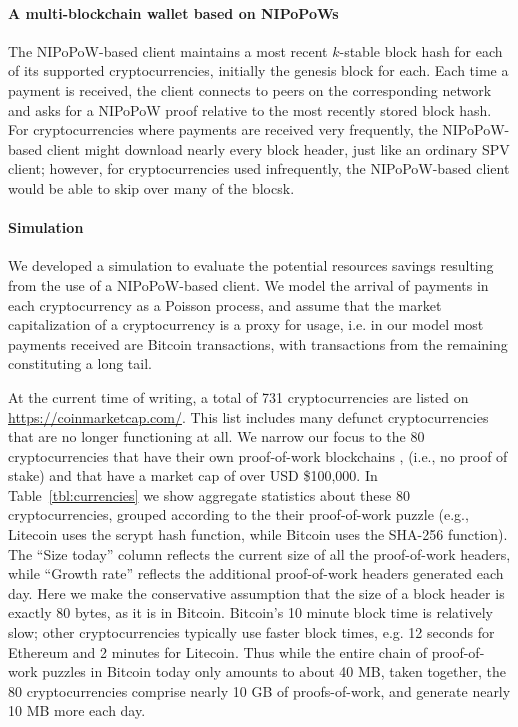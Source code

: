 \paragraph{A multi-blockchain wallet based on NIPoPoWs}
 The NIPoPoW-based client maintains a most recent $k$-stable block hash for each of its supported cryptocurrencies, initially the genesis block for each.
  Each time a payment is received, the client connects to peers on the corresponding network and asks for a NIPoPoW proof relative to the most recently stored block hash. For cryptocurrencies where payments are received very frequently, the NIPoPoW-based client might download nearly every block header, just like an ordinary SPV client; however, for cryptocurrencies used infrequently, the NIPoPoW-based client would be able to skip over many of the blocsk.

\paragraph{Simulation}
 We developed a simulation to evaluate the potential resources savings resulting from the use of a NIPoPoW-based client.
 We model the arrival of payments in each cryptocurrency as a Poisson process, and assume that the market capitalization of a cryptocurrency is a proxy for usage, i.e. in our model most payments received are Bitcoin transactions, with transactions from the remaining constituting a long tail.

 At the current time of writing, a total of 731 cryptocurrencies are listed on \url{https://coinmarketcap.com/}.
This list includes many defunct cryptocurrencies that are no longer functioning at all.
We narrow our focus to the 80 cryptocurrencies that have their own proof-of-work blockchains
, (i.e., no proof of stake) and that have a market cap of over USD \$100,000.
In Table~\ref{tbl:currencies} we show aggregate statistics about these 80 cryptocurrencies, grouped according to the their proof-of-work puzzle (e.g., Litecoin uses the scrypt hash function, while Bitcoin uses the SHA-256 function). The ``Size today'' column reflects the current size of all the proof-of-work headers, while ``Growth rate'' reflects the additional proof-of-work headers generated each day. Here we make the conservative assumption that the size of a block header is exactly 80 bytes, as it is in Bitcoin.
Bitcoin's 10 minute block time is relatively slow; other cryptocurrencies typically use faster block times, e.g. 12 seconds for Ethereum and 2 minutes for Litecoin. Thus while the entire chain of proof-of-work puzzles in Bitcoin today only amounts to about 40 MB, taken together, the 80 cryptocurrencies comprise nearly 10 GB of proofs-of-work, and generate nearly 10 MB more each day.

